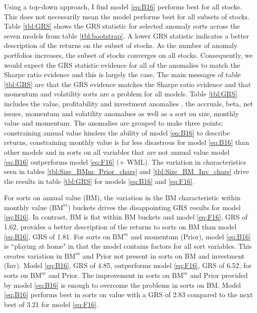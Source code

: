 
Using a top-down approach, I find model \ref{eq:B16} performs best for all
stocks.
This does not necessarily mean the model performs best for all subsets of
stocks.
Table \ref{tbl:GRS} shows the GRS statistic for selected anomaly sorts across
the seven models from table \ref{tbl:bootstrap}.
A lower GRS statistic indicates a better description of the returns on the
subset of stocks.
As the number of anomaly portfolios increases, the subset of stocks converges
on all stocks.
Consequently, we would expect the GRS statistic evidence for all of the
anomalies to match the Sharpe ratio evidence and this is largely the case.
The main messages of table \ref{tbl:GRS} are that the GRS evidence matches the
Sharpe ratio evidence and that momentum and volatility sorts are a problem for
all models.
Table \ref{tbl:GRS} includes the value, profitability and investment anomalies
\parencite{fama2006profitability, fama2015five},
the accruals, beta, net issues, momentum and volatility anomalues
\parencite{fama2016dissecting} as well as a sort on size, monthly value and
momentum.
The anomalies are grouped to make three points;
constraining annual value hinders the ability of model \ref{eq:B16} to describe
returns,
constraining monthly value is far less disastrous for model \ref{eq:B16}
than other models and
in sorts on all variables that are not annual value
model \ref{eq:B16} outperforms model \ref{eq:F16} (+ WML).
The variation in characteristics seen in tables \ref{tbl:Size_BMm_Prior_chars}
and \ref{tbl:Size_BM_Inv_chars} drive the results in table \ref{tbl:GRS}
for models \ref{eq:B16} and \ref{eq:F16}.

For sorts on annual value (BM), the variation in the BM characteristic within
monthly value ($\text{BM}^m$) buckets drives the disappointing GRS results for
model \ref{eq:B16}.
In contrast, BM is flat within BM buckets and model \ref{eq:F16}, GRS of 1.62,
provides a better description of the returns to sorts on BM than model
\ref{eq:B16}, GRS of 1.81.
For sorts on $\text{BM}^m$ and momentum (Prior), model \ref{eq:B16} is
``playing at home" in that the model contains factors for all sort variables.
This creates variation in $\text{BM}^m$ and Prior not present in sorts on BM
and investment (Inv). Model \ref{eq:B16}, GRS of 4.85, outperforms model
\ref{eq:F16}, GRS of 6.52, for sorts on $\text{BM}^m$ and Prior.
The improvement in sorts on $\text{BM}^m$ and Prior provided by model
\ref{eq:B16} is enough to overcome the problems in sorts on BM.
Model \ref{eq:B16} performs best in sorts on value with a GRS of 2.83 compared
to the next best of 3.21 for model \ref{eq:F16}.

